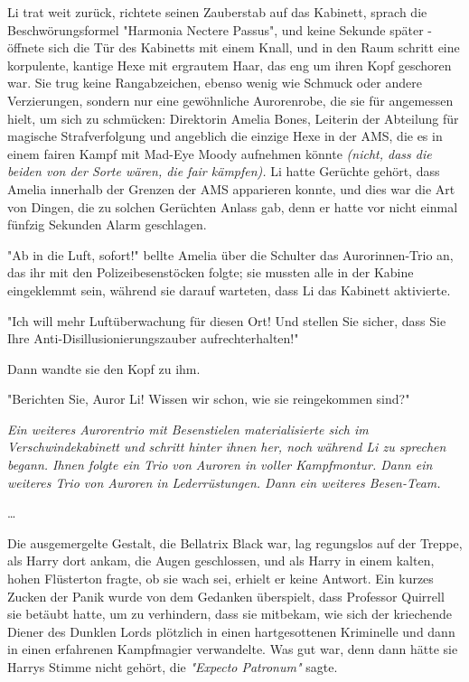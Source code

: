 {Li trat weit zurück, richtete seinen Zauberstab auf das Kabinett, sprach die Beschwörungsformel "Harmonia Nectere Passus", und keine Sekunde später - öffnete sich die Tür des Kabinetts mit einem Knall, und in den Raum schritt eine korpulente, kantige Hexe mit ergrautem Haar, das eng um ihren Kopf geschoren war. Sie trug keine Rangabzeichen, ebenso wenig wie Schmuck oder andere Verzierungen, sondern nur eine gewöhnliche Aurorenrobe, die sie für angemessen hielt, um sich zu schmücken: Direktorin Amelia Bones, Leiterin der Abteilung für magische Strafverfolgung und angeblich die einzige Hexe in der AMS, die es in einem fairen Kampf mit Mad-Eye Moody aufnehmen könnte \emph{(nicht, dass die beiden von der Sorte wären, die fair kämpfen).} Li hatte Gerüchte gehört, dass Amelia innerhalb der Grenzen der AMS apparieren konnte, und dies war die Art von Dingen, die zu solchen Gerüchten Anlass gab, denn er hatte vor nicht einmal fünfzig Sekunden Alarm geschlagen.

"Ab in die Luft, sofort!" bellte Amelia über die Schulter das Aurorinnen-Trio an, das ihr mit den Polizeibesenstöcken folgte; sie mussten alle in der Kabine eingeklemmt sein, während sie darauf warteten, dass Li das Kabinett aktivierte.

"Ich will mehr Luftüberwachung für diesen Ort! Und stellen Sie sicher, dass Sie Ihre Anti-Disillusionierungszauber aufrechterhalten!"

Dann wandte sie den Kopf zu ihm.

"Berichten Sie, Auror Li! Wissen wir schon, wie sie reingekommen sind?"

\emph{Ein weiteres Aurorentrio mit Besenstielen materialisierte sich im Verschwindekabinett und schritt hinter ihnen her, noch während Li zu sprechen begann. Ihnen folgte ein Trio von Auroren in voller Kampfmontur. Dann ein weiteres Trio von Auroren in Lederrüstungen. Dann ein weiteres Besen-Team.}

…

Die ausgemergelte Gestalt, die Bellatrix Black war, lag regungslos auf der Treppe, als Harry dort ankam, die Augen geschlossen, und als Harry in einem kalten, hohen Flüsterton fragte, ob sie wach sei, erhielt er keine Antwort. Ein kurzes Zucken der Panik wurde von dem Gedanken überspielt, dass Professor Quirrell sie betäubt hatte, um zu verhindern, dass sie mitbekam, wie sich der kriechende Diener des Dunklen Lords plötzlich in einen hartgesottenen Kriminelle und dann in einen erfahrenen Kampfmagier verwandelte. Was gut war, denn dann hätte sie Harrys Stimme nicht gehört, die \emph{"Expecto Patronum"} sagte.

}
